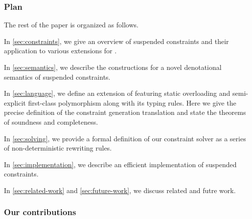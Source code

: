 \documentclass[acmsmall,screen,nonacm]{acmart}
\begin{document}
\subsubsection* {Plan}

The rest of the paper is organized as follows.
\begin{enumerate*}[label={}]
\item In \cref{sec:constraints}, we give an overview of suspended constraints and their 
application to various extensions for \ML. 
\item
  In \cref{sec:semantics}, we describe the constructions for a
  novel denotational semantics of suspended constraints.
\item
  In \cref{sec:language}, we define an extension of \ML featuring static
  overloading and semi-explicit first-class polymorphism along with its
  typing rules.  Here we give the precise definition of the constraint
  generation translation and state the theorems of soundness and
  completeness.
\item
  In \cref{sec:solving}, we provide a formal definition of our constraint
  solver as a series of non-deterministic rewriting rules.
\item
  In \cref{sec:implementation}, we describe an efficient implementation of
  suspended constraints.
\item
  In \cref{sec:related-work} and \cref{sec:future-work}, we discuss related
  and futre work.
\end{enumerate*}

\subsubsection* {Our contributions}
\end{document}
